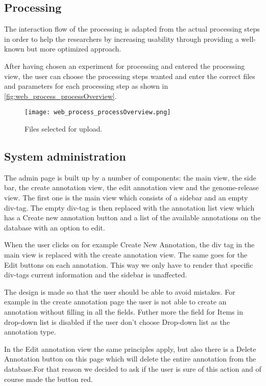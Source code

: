 \subsection{Processing}
The interaction flow of the processing is adapted from the actual processing 
steps in order to help the researchers by increasing usability through providing
a well-known but more optimized approach.

After having chosen an experiment for processing and entered the processing 
view, the user can choose the processing steps wanted and enter the correct
files and parameters for each processing step as shown in 
\autoref{fig:web_process_processOverview}.

\begin{figure}[h]
    \centering
    \texttt{[image: web\_process\_processOverview.png]}
    \caption{\footnotesize Files selected for upload.}
    \label{fig:web_process_processOverview}
\end{figure}

\subsection{System administration}
The admin page is built up by a number of components: the main view, the side bar, the create annotation view, the edit annotation view and the genome-release view. The first one is the main view which consists of a sidebar and an empty div-tag. The empty div-tag is then replaced with the annotation list view which has a Create new annotation button and a list of the available annotations on the database with an option to edit. 

When the user clicks on for example Create New Annotation, the div tag in the main view is replaced with the create annotation view. The same goes for the Edit buttons on each annotation. This way we only have to render that specific div-tags current information and the sidebar is unaffected. 

The design is made so that the user should be able to avoid mistakes. For example in the create annotation page the user is not able to create an annotation without filling in all the fields. Futher more the field for Items in drop-down list is disabled if the user don't choose Drop-down list as the annotation type. 

In the Edit annotation view the same principles apply, but also there is a Delete Annotation button on this page which will delete the entire annotation from the database.For that reason we decided to ask if the user is sure of this action and of course made the button red.

